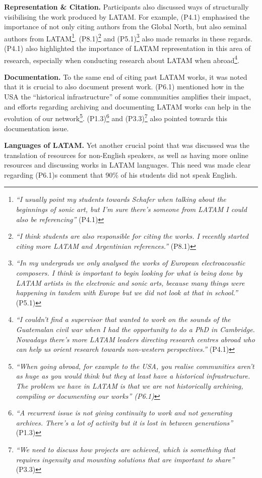 \documentclass[sigconf]{nimeart}
\begin{document}
\textbf{Representation \& Citation.} Participants also discussed ways of structurally visibilising the work produced by LATAM. For example, (P4.1) emphasised the importance of not only citing authors from the Global North, but also seminal authors from LATAM\footnote{\emph{``I usually point my students towards Schafer when talking about the beginnings of sonic art, but I'm sure there's someone from LATAM I could also be referencing''} (P4.1)}. (P8.1)\footnote{\emph{``I think students are also responsible for citing the works. I recently started citing more LATAM and Argentinian references.''} (P8.1)} and (P5.1)\footnote{\emph{``In my undergrads we only analysed the works of European electroacoustic composers. I think is important to begin looking for what is being done by LATAM artists in the electronic and sonic arts, because many things were happening in tandem with Europe but we did not look at that in school.''} (P5.1)} also made remarks in these regards. (P4.1) also highlighted the importance of LATAM representation in this area of research, especially when conducting research about LATAM when abroad\footnote{\emph{``I couldn't find a supervisor that wanted to work on the sounds of the Guatemalan civil war when I had the opportunity to do a PhD in Cambridge. Nowadays there's more LATAM leaders directing research centres abroad who can help us orient research towards non-western perspectives.''} (P4.1)}.

\textbf{Documentation.} To the same end of citing past LATAM works, it was noted that it is crucial to also document present work. (P6.1) mentioned how in the USA the ``historical infrastructure'' of some communities amplifies their impact, and efforts regarding archiving and documenting LATAM works can help in the evolution of our network\footnote{\emph{``When going abroad, for example to the USA, you realise communities aren't as huge as you would think but they at least have a historical infrastructure. The problem we have in LATAM is that we are not historically archiving, compiling or documenting our works'' (P6.1)}}. (P1.3)\footnote{\emph{``A recurrent issue is not giving continuity to work and not generating archives. There's a lot of activity but it is lost in between generations''} (P1.3)} and (P3.3)\footnote{\emph{``We need to discuss how projects are achieved, which is something that requires ingenuity and mounting solutions that are important to share''} (P3.3)} also pointed towards this documentation issue.

\textbf{Languages of LATAM.} Yet another crucial point that was discussed was the translation of resources for non-English speakers, as well as having more online resources and discussing works in LATAM languages. This need was made clear regarding (P6.1)\textquotesingle s comment that 90\% of his students did not speak English.
\end{document}
